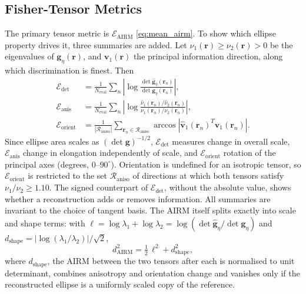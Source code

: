 \documentclass[journal]{IEEEtran}
\begin{document}
\subsection{Fisher-Tensor Metrics}
The primary tensor metric is \(\mathcal E_{\mathrm{AIRM}}\) \eqref{eq:mean_airm}. To show which ellipse property drives it, three summaries are added. Let \(\nu_1(\mathbf{r})\geq\nu_2(\mathbf{r})>0\) be the eigenvalues of \(\mathbf{g}_{\eta}(\mathbf{r})\), and \(\mathbf{v}_1(\mathbf{r})\) the principal information direction, along which discrimination is finest. Then
\begin{align}
\mathcal{E}_{\mathrm{det}} &=
\frac{1}{N_{\mathrm{eval}}}\sum_n
\left|\log\frac{\det\widehat{\mathbf{g}}_{\eta}(\mathbf{r}_n)}
{\det\mathbf{g}_{\eta}(\mathbf{r}_n)}\right|, \\
\mathcal{E}_{\mathrm{anis}} &=
\frac{1}{N_{\mathrm{eval}}}\sum_n
\left|\log\frac{\hat{\nu}_1(\mathbf{r}_n)/\hat{\nu}_2(\mathbf{r}_n)}
{\nu_1(\mathbf{r}_n)/\nu_2(\mathbf{r}_n)}\right|, \\
\mathcal{E}_{\mathrm{orient}} &=
\frac{1}{|\mathcal{R}_{\mathrm{aniso}}|}
\sum_{\mathbf{r}_n\in\mathcal{R}_{\mathrm{aniso}}}
\arccos
\left|\widehat{\mathbf{v}}_1(\mathbf{r}_n)^T\mathbf{v}_1(\mathbf{r}_n)\right|.
\end{align}
Since ellipse area scales as \((\det\mathbf g)^{-1/2}\), \(\mathcal E_{\mathrm{det}}\) measures change in overall scale, \(\mathcal E_{\mathrm{anis}}\) change in elongation independently of scale, and \(\mathcal E_{\mathrm{orient}}\) rotation of the principal axes (degrees, \(0\)--\(90^\circ\)). Orientation is undefined for an isotropic tensor, so \(\mathcal E_{\mathrm{orient}}\) is restricted to the set \(\mathcal{R}_{\mathrm{aniso}}\) of directions at which both tensors satisfy \(\nu_1/\nu_2\geq1.10\). The signed counterpart of \(\mathcal E_{\mathrm{det}}\), without the absolute value, shows whether a reconstruction adds or removes information. All summaries are invariant to the choice of tangent basis. The AIRM itself splits exactly into scale and shape terms: with \(\ell=\log\lambda_1+\log\lambda_2=\log(\det\widehat{\mathbf g}_\eta/\det\mathbf g_\eta)\) and \(d_{\mathrm{shape}}=|\log(\lambda_1/\lambda_2)|/\sqrt2\),
\begin{equation}
d_{\mathrm{AIRM}}^2=\tfrac12\,\ell^2+d_{\mathrm{shape}}^2,
\label{eq:airm_split}
\end{equation}
where \(d_{\mathrm{shape}}\), the AIRM between the two tensors after each is normalised to unit determinant, combines anisotropy and orientation change and vanishes only if the reconstructed ellipse is a uniformly scaled copy of the reference.
\end{document}

